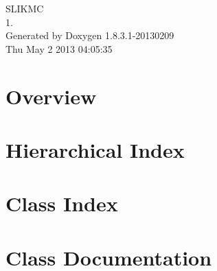 \documentclass{book}
\begin{document}
\hypersetup{pageanchor=false,citecolor=blue}
\begin{titlepage}
\vspace*{7cm}
\begin{center}
{\Large S\-L\-I\-K\-M\-C \\[1ex]\large 1. }\\
\vspace*{1cm}
{\large Generated by Doxygen 1.8.3.1-20130209}\\
\vspace*{0.5cm}
{\small Thu May 2 2013 04:05:35}\\
\end{center}
\end{titlepage}
\clearemptydoublepage
{}
\tableofcontents
\clearemptydoublepage
{}
\hypersetup{pageanchor=true,citecolor=blue}
\chapter{Overview}
\label{index}\hypertarget{index}{}
\chapter{Hierarchical Index}

\chapter{Class Index}

\chapter{Class Documentation}






















\printindex
\end{document}
